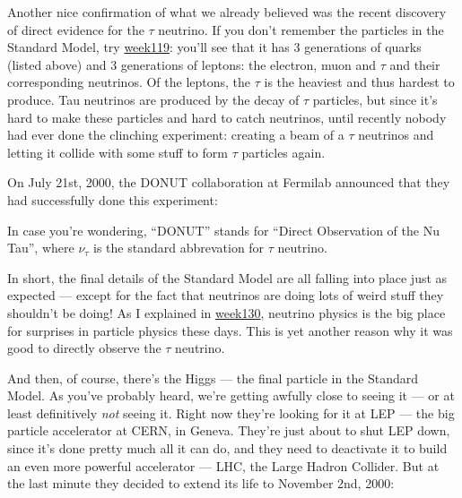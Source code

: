 \documentclass{article}
\def\tightlist{}
\renewcommand{\texttt}[1]{%
  \begingroup
  \ttfamily
  \begingroup\lccode`~=`/\lowercase{\endgroup\def~}{/\discretionary{}{}{}}%
  \begingroup\lccode`~=`[\lowercase{\endgroup\def~}{[\discretionary{}{}{}}%
  \begingroup\lccode`~=`.\lowercase{\endgroup\def~}{.\discretionary{}{}{}}%
  \catcode`/=\active\catcode`[=\active\catcode`.=\active
  \scantokens{#1\noexpand}%
  \endgroup
}
\begin{document}
Another nice confirmation of what we already believed was the recent
discovery of direct evidence for the \(\tau\) neutrino. If you don't
remember the particles in the Standard Model, try
\href{week119.html}{week119}: you'll see that it has 3 generations of
quarks (listed above) and 3 generations of leptons: the electron, muon
and \(\tau\) and their corresponding neutrinos. Of the leptons, the
\(\tau\) is the heaviest and thus hardest to produce. Tau neutrinos are
produced by the decay of \(\tau\) particles, but since it's hard to make
these particles and hard to catch neutrinos, until recently nobody had
ever done the clinching experiment: creating a beam of a \(\tau\)
neutrinos and letting it collide with some stuff to form \(\tau\)
particles again.

On July 21st, 2000, the DONUT collaboration at Fermilab announced that
they had successfully done this experiment:


In case you're wondering, ``DONUT'' stands for ``Direct Observation of
the Nu Tau'', where \(\nu_\tau\) is the standard abbrevation for
\(\tau\) neutrino.

In short, the final details of the Standard Model are all falling into
place just as expected --- except for the fact that neutrinos are doing
lots of weird stuff they shouldn't be doing! As I explained in
\href{week130.html}{week130}, neutrino physics is the big place for
surprises in particle physics these days. This is yet another reason why
it was good to directly observe the \(\tau\) neutrino.

And then, of course, there's the Higgs --- the final particle in the
Standard Model. As you've probably heard, we're getting awfully close to
seeing it --- or at least definitively \emph{not} seeing it. Right now
they're looking for it at LEP --- the big particle accelerator at CERN,
in Geneva. They're just about to shut LEP down, since it's done pretty
much all it can do, and they need to deactivate it to build an even more
powerful accelerator --- LHC, the Large Hadron Collider. But at the last
minute they decided to extend its life to November 2nd, 2000:
\end{document}
